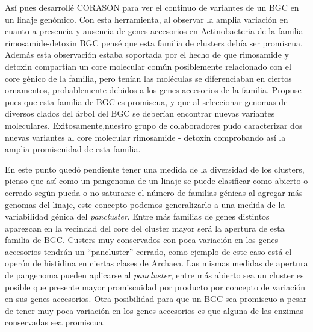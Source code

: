 \documentclass[12pt,twoside]{reedthesis}
\begin{document}
  Así pues desarrollé CORASON para ver el continuo de variantes de un BGC
  en un linaje genómico. Con esta herramienta, al observar la amplia
  variación en cuanto a presencia y ausencia de genes accesorios en
  Actinobacteria de la familia rimosamide-detoxin BGC pensé que esta
  familia de clusters debía ser promiscua. Además esta observación estaba
  soportada por el hecho de que rimosamide y detoxin compartían un core
  molecular común posiblemente relacionado con el core génico de la
  familia, pero tenían las moléculas se diferenciaban en ciertos
  ornamentos, probablemente debidos a los genes accesorios de la familia.
  Propuse pues que esta familia de BGC es promiscua, y que al seleccionar
  genomas de diversos clados del árbol del BGC se deberían encontrar
  nuevas variantes moleculares. Exitosamente,nuestro grupo de
  colaboradores pudo caracterizar dos nuevas variantes al core molecular
  rimosamide - detoxin comprobando así la amplia promiscuidad de esta
  familia.
  
  En este punto quedó pendiente tener una medida de la diversidad de los
  clusters, pienso que así como un pangenoma de un linaje se puede
  clasificar como abierto o cerrado según pueda o no saturarse el número
  de familias génicas al agregar más genomas del linaje, este concepto
  podemos generalizarlo a una medida de la variabilidad génica del
  \emph{pancluster}. Entre más familias de genes distintos aparezcan en la
  vecindad del core del cluster mayor será la apertura de esta familia de
  BGC. Custers muy conservados con poca variación en los genes accesorios
  tendrán un ``pancluster'' cerrado, como ejemplo de este caso está el
  operón de histidina en ciertas clases de Archaea. Las mismas medidas de
  apertura de pangenoma pueden aplicarse al \emph{pancluster}, entre más
  abierto sea un cluster es posible que presente mayor promiscuidad por
  producto por concepto de variación en sus genes accesorios. Otra
  posibilidad para que un BGC sea promiscuo a pesar de tener muy poca
  variación en los genes accesorios es que alguna de las enzimas
  conservadas sea promiscua.
  
\end{document}
